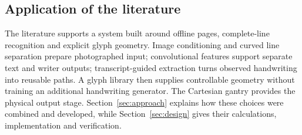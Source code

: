 \subsection{Application of the literature}
\label{sec:lit-application}
\label{sec:lit-embedded}
The literature supports a system built around offline pages, complete-line recognition and explicit glyph geometry. Image conditioning and curved line separation prepare photographed input; convolutional features support separate text and writer outputs; transcript-guided extraction turns observed handwriting into reusable paths. A glyph library then supplies controllable geometry without training an additional handwriting generator. The Cartesian gantry provides the physical output stage. Section~\ref{sec:approach} explains how these choices were combined and developed, while Section~\ref{sec:design} gives their calculations, implementation and verification.
